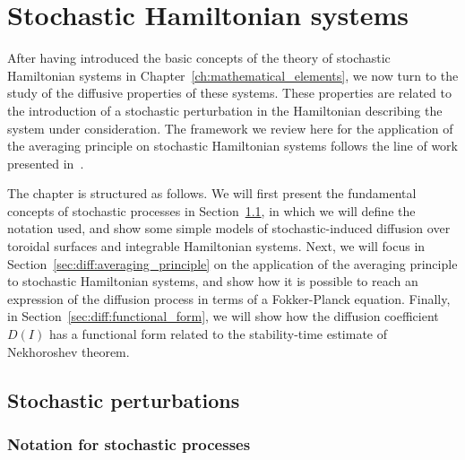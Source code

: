 
\chapter{Stochastic Hamiltonian systems}\label{ch:the_diffusive_framework}

After having introduced the basic concepts of the theory of stochastic Hamiltonian systems in Chapter~\ref{ch:mathematical_elements}, we now turn to the study of the diffusive properties of these systems. These properties are related to the introduction of a stochastic perturbation in the Hamiltonian describing the system under consideration. The framework we review here for the application of the averaging principle on stochastic Hamiltonian systems follows the line of work presented in~\cite{Bazzani9948, Bazzani:2019lse, bazzani2020diffusion}.

The chapter is structured as follows. We will first present the fundamental concepts of stochastic processes in Section~\ref{sec:diff:stochastic_perturbations}, in which we will define the notation used, and show some simple models of stochastic-induced diffusion over toroidal surfaces and integrable Hamiltonian systems. Next, we will focus in Section~\ref{sec:diff:averaging_principle} on the application of the averaging principle to stochastic Hamiltonian systems, and show how it is possible to reach an expression of the diffusion process in terms of a Fokker-Planck equation. Finally, in Section~\ref{sec:diff:functional_form}, we will show how the diffusion coefficient $D(I)$ has a functional form related to the stability-time estimate of Nekhoroshev theorem.

\section{Stochastic perturbations}
\label{sec:diff:stochastic_perturbations}

\subsection{Notation for stochastic processes}
\label{subsec:Diffusion for a stochastically perturbed integrable system}

